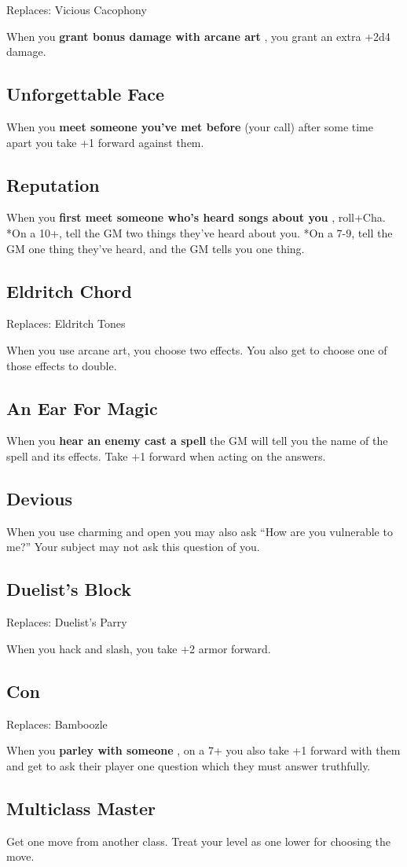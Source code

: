  Replaces: Vicious Cacophony


 When you \textbf{grant bonus damage with arcane art}
, you grant an extra +2d4 damage.
\subsection{Unforgettable Face}


 When you \textbf{meet someone you've met before}
 (your call) after some time apart you take +1 forward against them.
\subsection{Reputation}


 When you \textbf{first meet someone who's heard songs about you}
, roll+Cha. *On a 10+, tell the GM two things they've heard about you. *On a 7-9, tell the GM one thing they've heard, and the GM tells you one thing.
\subsection{Eldritch Chord}


 Replaces: Eldritch Tones


 When you use arcane art, you choose two effects. You also get to choose one of those effects to double.
\subsection{An Ear For Magic}


 When you \textbf{hear an enemy cast a spell}
 the GM will tell you the name of the spell and its effects. Take +1 forward when acting on the answers.
\subsection{Devious}


 When you use charming and open you may also ask ``How are you vulnerable to me?'' Your subject may not ask this question of you.
\subsection{Duelist's Block}


 Replaces: Duelist's Parry


 When you hack and slash, you take +2 armor forward.
\subsection{Con}


 Replaces: Bamboozle


 When you \textbf{parley with someone}
, on a 7+ you also take +1 forward with them and get to ask their player one question which they must answer truthfully.
\subsection{Multiclass Master}


 Get one move from another class. Treat your level as one lower for choosing the move.


